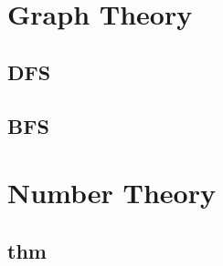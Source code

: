 \section{Graph Theory}
    \subsection{DFS}
        
    \subsection{BFS}
        

\section{Number Theory}
    \subsection{thm}
        